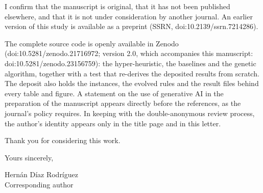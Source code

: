 \documentclass[11pt]{article}
\begin{document}
I confirm that the manuscript is original, that it has not been
published elsewhere, and that it is not under consideration by another
journal. An earlier version of this study is available as a preprint
(SSRN, doi:10.2139/ssrn.7214286).

The complete source code is openly available in Zenodo
(doi:10.5281/zenodo.21716972; version 2.0, which accompanies this
manuscript: doi:10.5281/zenodo.23156759): the hyper-heuristic, the baselines and
the genetic algorithm, together with a test that re-derives the
deposited results from scratch. The deposit also holds the instances,
the evolved rules and the result files behind every table and figure. A
statement on the use of generative AI in the preparation of the
manuscript appears directly before the references, as the journal's
policy requires. In keeping with the double-anonymous review process,
the author's identity appears only in the title page and in this letter.

Thank you for considering this work.

\vspace{0.7em}
\noindent Yours sincerely,

\vspace{1.2em}
\noindent Hern\'an D\'iaz Rodr\'iguez\\
Corresponding author
\end{document}
